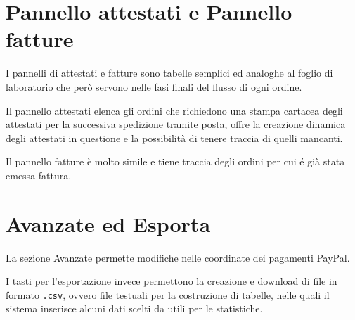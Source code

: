\section*{Pannello attestati e Pannello fatture}
I pannelli di attestati e fatture sono tabelle semplici ed analoghe al foglio di laboratorio che però servono nelle fasi finali del flusso di ogni ordine.

Il \textsf{pannello attestati} elenca gli ordini che richiedono una stampa cartacea degli attestati per la successiva spedizione tramite posta, offre la creazione dinamica degli attestati in questione e la possibilità di tenere traccia di quelli mancanti.

Il \textsf{pannello fatture} è molto simile e tiene traccia degli ordini per cui é già stata emessa fattura.

\section*{Avanzate ed Esporta}
La sezione \textsf{Avanzate} permette modifiche nelle coordinate dei pagamenti PayPal. 

I tasti per l'\textsf{esportazione} invece permettono la creazione e download di file in formato \texttt{.csv}, ovvero file testuali per la costruzione di tabelle, nelle quali il sistema inserisce alcuni dati scelti da {\fem} utili per le statistiche.
